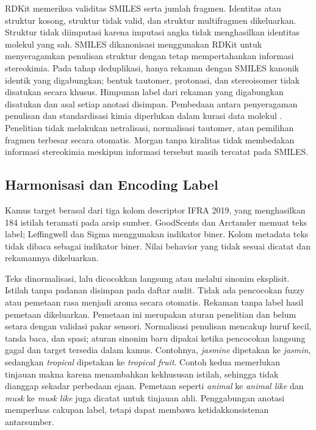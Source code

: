 RDKit memeriksa validitas SMILES serta jumlah fragmen. Identitas atau struktur kosong, struktur tidak valid, dan struktur multifragmen dikeluarkan. Struktur tidak diimputasi karena imputasi angka tidak menghasilkan identitas molekul yang sah. SMILES dikanonisasi menggunakan RDKit untuk menyeragamkan penulisan struktur dengan tetap mempertahankan informasi stereokimia. Pada tahap deduplikasi, hanya rekaman dengan SMILES kanonik identik yang digabungkan; bentuk tautomer, protonasi, dan stereoisomer tidak disatukan secara khusus. Himpunan label dari rekaman yang digabungkan disatukan dan asal setiap anotasi disimpan. Pembedaan antara penyeragaman penulisan dan standardisasi kimia diperlukan dalam kurasi data molekul \cite{fourches2016}. Penelitian tidak melakukan netralisasi, normalisasi tautomer, atau pemilihan fragmen terbesar secara otomatis. Morgan tanpa kiralitas tidak membedakan informasi stereokimia meskipun informasi tersebut masih tercatat pada SMILES.

\subsection{Harmonisasi dan Encoding Label}
Kamus target berasal dari tiga kolom descriptor IFRA 2019, yang menghasilkan 184 istilah teramati pada arsip sumber. GoodScents dan Arctander memuat teks label; Leffingwell dan Sigma menggunakan indikator biner. Kolom metadata teks tidak dibaca sebagai indikator biner. Nilai behavior yang tidak sesuai dicatat dan rekamannya dikeluarkan.

Teks dinormalisasi, lalu dicocokkan langsung atau melalui sinonim eksplisit. Istilah tanpa padanan disimpan pada daftar audit. Tidak ada pencocokan fuzzy atau pemetaan rasa menjadi aroma secara otomatis. Rekaman tanpa label hasil pemetaan dikeluarkan. Pemetaan ini merupakan aturan penelitian dan belum setara dengan validasi pakar sensori. Normalisasi penulisan mencakup huruf kecil, tanda baca, dan spasi; aturan sinonim baru dipakai ketika pencocokan langsung gagal dan target tersedia dalam kamus. Contohnya, \textit{jasmine} dipetakan ke \textit{jasmin}, sedangkan \textit{tropical} dipetakan ke \textit{tropical fruit}. Contoh kedua memerlukan tinjauan makna karena menambahkan kekhususan istilah, sehingga tidak dianggap sekadar perbedaan ejaan. Pemetaan seperti \textit{animal} ke \textit{animal like} dan \textit{musk} ke \textit{musk like} juga dicatat untuk tinjauan ahli. Penggabungan anotasi memperluas cakupan label, tetapi dapat membawa ketidakkonsistenan antarsumber.

